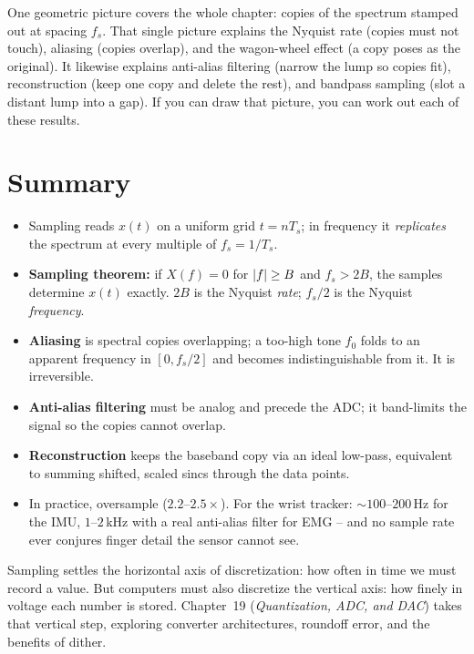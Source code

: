 \begin{aestheticbox}
One geometric picture covers the whole chapter: copies of the spectrum stamped out at
spacing $f_s$. That single picture explains the Nyquist rate (copies must not touch), aliasing (copies
overlap), and the wagon-wheel effect (a copy poses as the original). It likewise explains anti-alias filtering
(narrow the lump so copies fit), reconstruction (keep one copy and delete the rest), and
bandpass sampling (slot a distant lump into a gap). If you can draw that picture, you can
work out each of these results.
\end{aestheticbox}

\section{Summary}
\label{ch18:summary}

\begin{itemize}
\item Sampling reads $x(t)$ on a uniform grid $t=nT_s$; in frequency it
      \emph{replicates} the spectrum at every multiple of $f_s=1/T_s$.
\item \textbf{Sampling theorem:} if $X(f)=0$ for $\lvert f\rvert\ge B$ and $f_s > 2B$, the
      samples determine $x(t)$ exactly. $2B$ is the Nyquist \emph{rate}; $f_s/2$ is the
      Nyquist \emph{frequency}.
\item \textbf{Aliasing} is spectral copies overlapping; a too-high tone $f_0$ folds to
      an apparent frequency in $[0,f_s/2]$ and becomes indistinguishable from it. It is
      irreversible.
\item \textbf{Anti-alias filtering} must be analog and precede the ADC; it band-limits
      the signal so the copies cannot overlap.
\item \textbf{Reconstruction} keeps the baseband copy via an ideal low-pass, equivalent
      to summing shifted, scaled sincs through the data points.
\item In practice, oversample ($2.2$--$2.5\times$). For the wrist tracker:
      $\sim 100$--$200$\,Hz for the IMU, $1$--$2$\,kHz with a real anti-alias filter for
      EMG -- and no sample rate ever conjures finger detail the sensor cannot see.
\end{itemize}

Sampling settles the horizontal axis of discretization: how often in time we must
record a value. But computers must also discretize the vertical axis: how finely in
voltage each number is stored. Chapter~19 (\emph{Quantization, ADC, and DAC}) takes that
vertical step, exploring converter architectures, roundoff error, and the benefits
of dither.

